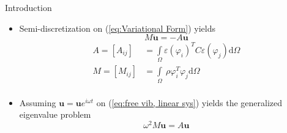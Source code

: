 \documentclass{beamer}[10pt]
\begin{document}
\begin{frame}{Introduction}


  \begin{itemize}
  \item {
    Semi-discretization on (\ref{eq:Variational Form}) yields
    \begin{equation}
    M\ddot{\boldsymbol{u}} = -A\boldsymbol{u}
    \label{eq:free vib, linear sys}
    \end{equation}
    \footnotesize
    \begin{align*}
    A  = \left[ A_{ij} \right] & = \int\limits_{\Omega} \varepsilon \left( \varphi_i \right)^T C\varepsilon\left( \varphi_j \right) \mathrm{d} \Omega \\
    M  = \left[ M_{ij} \right] &= \int\limits_{\Omega} \ \rho \varphi_{i}^T \varphi_j \mathrm{d} \Omega \\ 
    \end{align*}
    \normalsize
  }
  \item {
	Assuming $\boldsymbol{u} = \boldsymbol{u}e^{i\omega t}$ on (\ref{eq:free vib, linear sys}) yields the generalized eigenvalue problem
	\begin{equation}
	\omega^2 M\boldsymbol{u} = A\boldsymbol{u}
	\label{eq:eigenvalue problem}
	\end{equation}	  
  }
  \end{itemize}
\end{frame}
\end{document}
